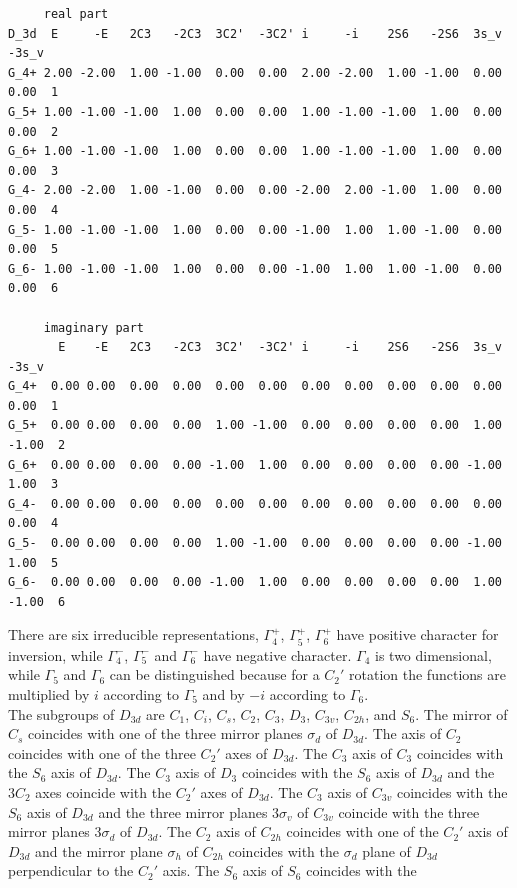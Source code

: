 \documentclass[12pt,a4paper]{article}
\begin{document}
\begin{verbatim}
     real part
D_3d  E     -E   2C3   -2C3  3C2'  -3C2' i     -i    2S6   -2S6  3s_v  -3s_v
G_4+ 2.00 -2.00  1.00 -1.00  0.00  0.00  2.00 -2.00  1.00 -1.00  0.00  0.00  1
G_5+ 1.00 -1.00 -1.00  1.00  0.00  0.00  1.00 -1.00 -1.00  1.00  0.00  0.00  2
G_6+ 1.00 -1.00 -1.00  1.00  0.00  0.00  1.00 -1.00 -1.00  1.00  0.00  0.00  3
G_4- 2.00 -2.00  1.00 -1.00  0.00  0.00 -2.00  2.00 -1.00  1.00  0.00  0.00  4 
G_5- 1.00 -1.00 -1.00  1.00  0.00  0.00 -1.00  1.00  1.00 -1.00  0.00  0.00  5
G_6- 1.00 -1.00 -1.00  1.00  0.00  0.00 -1.00  1.00  1.00 -1.00  0.00  0.00  6

     imaginary part
       E    -E   2C3   -2C3  3C2'  -3C2' i     -i    2S6   -2S6  3s_v  -3s_v
G_4+  0.00 0.00  0.00  0.00  0.00  0.00  0.00  0.00  0.00  0.00  0.00  0.00  1
G_5+  0.00 0.00  0.00  0.00  1.00 -1.00  0.00  0.00  0.00  0.00  1.00 -1.00  2
G_6+  0.00 0.00  0.00  0.00 -1.00  1.00  0.00  0.00  0.00  0.00 -1.00  1.00  3
G_4-  0.00 0.00  0.00  0.00  0.00  0.00  0.00  0.00  0.00  0.00  0.00  0.00  4
G_5-  0.00 0.00  0.00  0.00  1.00 -1.00  0.00  0.00  0.00  0.00 -1.00  1.00  5
G_6-  0.00 0.00  0.00  0.00 -1.00  1.00  0.00  0.00  0.00  0.00  1.00 -1.00  6
\end{verbatim}
There are six irreducible representations, $\Gamma_4^+$, $\Gamma_5^+$,
$\Gamma_6^+$ have positive character for inversion, while $\Gamma_4^-$, 
$\Gamma_5^-$ and $\Gamma_6^-$ have negative character. $\Gamma_4$ is two 
dimensional, while $\Gamma_5$ and $\Gamma_6$ can be distinguished because 
for a $C_2'$ rotation the functions are multiplied by $i$ according to 
$\Gamma_5$ and by $-i$ according to $\Gamma_6$. \\
The subgroups of $D_{3d}$ are $C_1$, $C_i$, $C_s$, $C_2$, $C_3$, $D_3$, 
$C_{3v}$, $C_{2h}$, and $S_6$. The mirror of $C_s$ coincides with one
of the three mirror planes $\sigma_d$ of $D_{3d}$. The axis of $C_2$
coincides with one of the three $C_2'$ axes of $D_{3d}$. 
The $C_3$ axis of $C_3$ coincides with the $S_6$ axis of $D_{3d}$.
The $C_3$ axis of $D_3$ coincides with the $S_6$ axis of $D_{3d}$ and the
$3C_2$ axes coincide with the $C_2'$ axes of $D_{3d}$. The $C_3$ axis
of $C_{3v}$ coincides with the $S_6$ axis of $D_{3d}$ and the three
mirror planes $3\sigma_v$ of $C_{3v}$ coincide with the three mirror
planes $3\sigma_d$ of $D_{3d}$. The $C_2$ axis of 
$C_{2h}$ coincides with one of the $C_2'$ axis of $D_{3d}$ and the mirror
plane $\sigma_h$ of $C_{2h}$ coincides with the $\sigma_d$ plane of $D_{3d}$
perpendicular to the $C_2'$ axis. The $S_6$ axis of $S_6$ coincides with the
\end{document}
